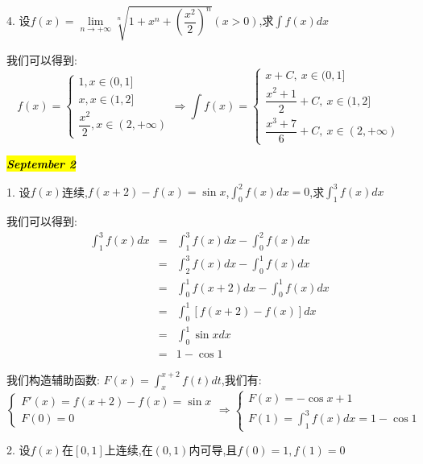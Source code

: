 4. 设$f(x)=\lim\limits_{n\rightarrow+\infty}\sqrt[n]{1+x^n+\left( \dfrac{x^2}{2}\right) ^n}(x>0)$,求$\int f(x)dx$

\begin{solution}

	我们可以得到:  
	$$f(x)=\left\lbrace
	\begin{array}{l}
		1,x\in(0,1]\\
		x,x\in(1,2]\\
		\dfrac{x^2}{2},x\in(2,+\infty)
	\end{array}
	\right. \Rightarrow \int f(x)=\left\lbrace
	\begin{array}{l}
		x+C,\ x\in(0,1]\\
		\dfrac{x^2+1}{2}+C,\ x\in(1,2]\\
		\dfrac{x^3+7}{6}+C,\ x\in(2,+\infty)
	\end{array}
	\right. $$
\end{solution}

\hl{\textbf{\textit{September 2}}}

1. 设$f(x)$连续,$f(x+2)-f(x)=\sin x$,$\int_{0}^{2}f(x)dx=0$,求$\int_{1}^{3}f(x)dx$
\begin{solution}

	我们可以得到:  
	\begin{eqnarray*}
		\int_{1}^{3}f(x)dx&=&\int_{1}^{3}f(x)dx-\int_{0}^{2}f(x)dx\\
		&=&\int_{2}^{3}f(x)dx-\int_{0}^{1}f(x)dx\\
		&=&\int_{0}^{1}f(x+2)dx-\int_{0}^{1}f(x)dx\\
		&=&\int_{0}^{1}[f(x+2)-f(x)]dx\\
		&=&\int_{0}^{1}\sin xdx\\
		&=&1-\cos 1
	\end{eqnarray*}
	\begin{anymark}[注]
	我们构造辅助函数:  $F(x)=\int_{x}^{x+2}f(t)dt$,我们有:  
	$$\left\lbrace
	\begin{array}{l}
		F'(x)=f(x+2)-f(x)=\sin x\\
		F(0)=0
	\end{array}
	\right. \Rightarrow \left\lbrace
	\begin{array}{l}
		F(x)=-\cos x+1\\
		F(1)=\int_{1}^{3}f(x)dx=1-\cos 1
	\end{array}
	\right.$$
	\end{anymark}
\end{solution}

2. 设$f(x)$在$[0,1]$上连续,在$(0,1)$内可导,且$f(0)=1,f(1)=0$

